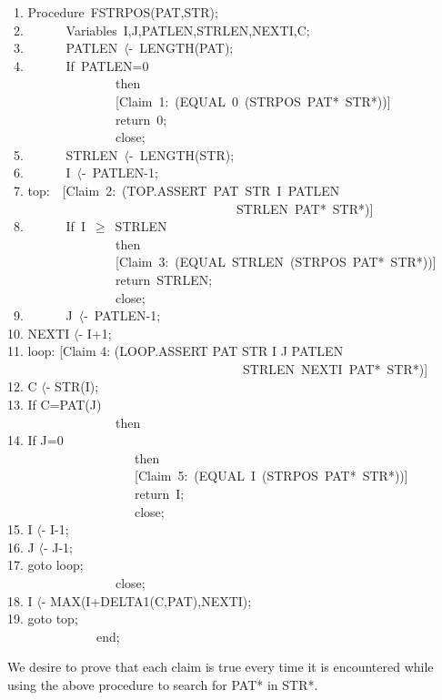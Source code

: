 \documentclass[10pt]{book}
\newenvironment{pubasis}{\begin{flushleft}}{\end{flushleft}}
\begin{document}
\pagebreak
\begin{pubasis}
~1.	Procedure~FSTRPOS(PAT,STR);\\
~2.	~~~~~~Variables~I,J,PATLEN,STRLEN,NEXTI,C;\\

~3.	~~~~~~PATLEN~$\langle$-~LENGTH(PAT);\\
~4.	~~~~~~If~PATLEN=0\\
~~~~~~~~~~~~~~~~~then\\
~~~~~~~~~~~~~~~~~{[}Claim~1:~(EQUAL~0~(STRPOS~PAT*~STR*)){]}\\
~~~~~~~~~~~~~~~~~return~0;\\
~~~~~~~~~~~~~~~~~close;\\

~5.	~~~~~~STRLEN~$\langle$-~LENGTH(STR);\\
~6.	~~~~~~I~$\langle$-~PATLEN-1;\\

~7.	top:~~{[}Claim~2:~(TOP.ASSERT~PAT~STR~I~PATLEN\\
~~~~~~~~~~~~~~~~~~~~~~~~~~~~~~~~~~~~STRLEN~PAT*~STR*)]\\

~8.	~~~~~~If~I~$\geq$~STRLEN\\
~~~~~~~~~~~~~~~~~then\\
~~~~~~~~~~~~~~~~~{[}Claim~3:~(EQUAL~STRLEN~(STRPOS~PAT*~STR*)){]}\\
~~~~~~~~~~~~~~~~~return~STRLEN;\\
~~~~~~~~~~~~~~~~~close;\\

~9.	~~~~~~J~$\langle$-~PATLEN-1;\\
10.	      NEXTI $\langle$- I+1;\\

11.	loop: {[}Claim 4: (LOOP.ASSERT PAT STR I J PATLEN\\
~~~~~~~~~~~~~~~~~~~~~~~~~~~~~~~~~~~~~STRLEN~NEXTI~PAT*~STR*)]\\

12.	      C $\langle$- STR(I);\\
13.	      If C=PAT(J)\\
~~~~~~~~~~~~~~~~~then\\
14.		 If J=0\\
~~~~~~~~~~~~~~~~~~~~then\\
~~~~~~~~~~~~~~~~~~~~{[}Claim~5:~(EQUAL~I~(STRPOS~PAT*~STR*)){]}\\
~~~~~~~~~~~~~~~~~~~~return~I;\\
~~~~~~~~~~~~~~~~~~~~close;\\
15.		 I $\langle$- I-1;\\
16.		 J $\langle$- J-1;\\
17.		 goto loop;\\
~~~~~~~~~~~~~~~~~close;\\

18.	      I $\langle$- MAX(I+DELTA1(C,PAT),NEXTI);\\
19.	      goto top;\\

~~~~~~~~~~~~~~end;\\
\end{pubasis}
We desire to prove that each claim is true every time it is encountered
while using the above procedure to search for PAT* in STR*.
\end{document}
